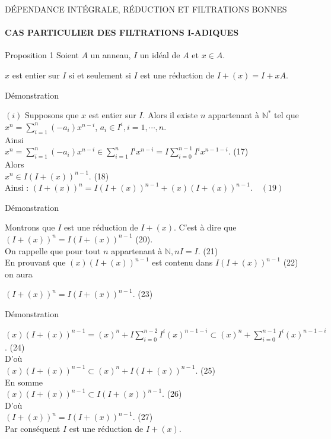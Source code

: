 \documentclass[11pt,a4paper]{beamer}
\begin{document}
		\begin{frame}{DÉPENDANCE INTÉGRALE, RÉDUCTION ET FILTRATIONS BONNES}
		\framesubtitle{CAS PARTICULIER DES FILTRATIONS I-ADIQUES}
		\begin{block}{Proposition 1}
				Soient $A$ un anneau, $I$ un idéal de $A$ et $x \in A$.
				\begin{center}
					$x$ est entier sur $I$ si et seulement si $I$ est une réduction de $I + (x) = I +xA $.
				\end{center}
		\end{block}
	\end{frame}
			\begin{frame}{Démonstration}
		\begin{block}{}
	$(i)$ Supposons que $x$ est entier sur $I$. Alors il existe $n $ appartenant à $ \mathbb{N^*}$ tel que \\ $x^n = \displaystyle \sum_{i=1}^{n}{(-a_i) x^{n-i}}$,  $a_i \in I^i, i=1, \cdots ,n$.\\ Ainsi \\ $x^n = \displaystyle \sum_{i=1}^{n}{(-a_i) x^{n-i}} \in \displaystyle \sum_{i=1}^{n}{I^i x^{n-i}} = I \displaystyle \sum_{i=0}^{n-1}{I^i x^{n-1-i}} $. (17)\\ Alors \\ $ x^n \in I(I+(x))^{n-1}.$ (18)\\
	Ainsi : $(I+(x))^n = I(I+(x))^{n-1} + (x)(I+(x))^{n-1}. \quad (19)$
		\end{block}
	\end{frame}

	
			\begin{frame}{Démonstration}
		\begin{block}{}
			Montrons que $I$ est une réduction de $I + (x)$. C'est à dire que $(I+(x))^{n} = I(I+(x))^{n-1}$ (20).\\ On rappelle que pour tout $n $ appartenant à $ \mathbb{N}, nI = I.$ (21)\\
			En prouvant que $(x)(I+(x))^{n-1} $ est contenu dans $ I(I+(x))^{n-1}$ (22) on aura
			\begin{center}
				$(I+(x))^n = I(I+(x))^{n-1}$. (23)
			\end{center}
		\end{block}
	\end{frame}
	\begin{frame}{Démonstration}
		\begin{block}{}
			$(x)(I+(x))^{n-1} = (x)^n + I\displaystyle \sum_{i=0}^{n-2}{I^i (x)^{n-1-i}} \subset (x)^n + \displaystyle \sum_{i=0}^{n-1}{I^i (x)^{n-1-i}}$. (24)\\
			D'où \\$(x)(I+(x))^{n-1} \subset (x)^n + I(I+(x))^{n-1}.$ (25)\\
			En somme \\$(x)(I+(x))^{n-1} \subset I(I+(x))^{n-1}.$ (26) \\ D'où \\$ (I+(x))^{n} = I(I+(x))^{n-1}$. (27)\\
			Par conséquent $I$ est une réduction de $I + (x)$.
		\end{block}
	\end{frame}
	
\end{document}
